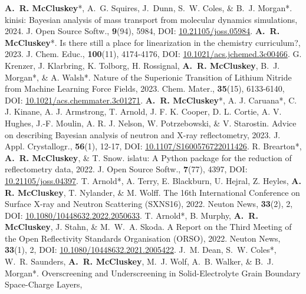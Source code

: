 \begin{benumerate}{25}
  \cvpuby
    {\textbf{A.~R. McCluskey}*, A.~G. Squires, J.~Dunn, S.~W. Coles, \& B.~J. Morgan*.}
    {kinisi: Bayesian analysis of mass transport from molecular dynamics simulations,}
    {2024.}
    {J. Open Source Softw.,}
    {\textbf{9}(94), 5984,}
    {DOI: \href{https://doi.org/10.21105/joss.05984}{10.21105/joss.05984}.}
   \cvpuby
    {\textbf{A.~R. McCluskey}*.}
    {Is there still a place for linearization in the chemistry curriculum?,}
    {2023.}
    {J. Chem. Educ.,}
    {\textbf{100}(11), 4174-4176,}
    {DOI: \href{https://doi.org/10.1021/acs.jchemed.3c00466}{10.1021/acs.jchemed.3c00466}.}
  \cvpuby
    {G. Krenzer, J. Klarbring, K. Tolborg, H. Rossignal, \textbf{A.~R. McCluskey}, B.~J. Morgan*, \& A. Walsh*.}
    {Nature of the Superionic Transition of Lithium Nitride from Machine Learning Force Fields,}
    {2023.}
    {Chem. Mater.,}
    {\textbf{35}(15), 6133-6140,}
    {DOI: \href{https://doi.org/10.1021/acs.chemmater.3c01271}{10.1021/acs.chemmater.3c01271}.}
  \cvpuby
    {\textbf{A.~R. McCluskey}*, A. J. Caruana*, C. J. Kinane, A. J. Armstrong, T. Arnold, J. F. K. Cooper, D. L. Cortie, A. V. Hughes, J.-F. Moulin, A. R. J. Nelson, W. Potrzebowski, \& V. Starostin.}
    {Advice on describing Bayesian analysis of neutron and X-ray reflectometry,}
    {2023.}
    {J. Appl. Crystallogr.,}
    {\textbf{56}(1), 12-17,}
    {DOI: \href{https://doi.org/10.1107/S1600576722011426}{10.1107/S1600576722011426}.}
  \cvpuby
    {R. Brearton*, \textbf{A.~R. McCluskey}, \& T. Snow.}
    {islatu: A Python package for the reduction of reflectometry data,}
    {2022.}
    {J. Open Source Softw.,}
    {\textbf{7}(77), 4397,}
    {DOI: \href{https://doi.org/10.21105/joss.04397}{10.21105/joss.04397}.}
  \cvpuby
    {T. Arnold*, A. Terry, E. Blackburn, U. Hejral, Z. Heyles, \textbf{A. R. McCluskey}, T. Nylander, \& M. Wolff.}
    {The 16th International Conference on Surface X-ray and Neutron Scattering (SXNS16),}
    {2022.}
    {Neuton News,}
    {\textbf{33}(2), 2,}
    {DOI: \href{https://doi.org/10.1080/10448632.2022.2050633}{10.1080/10448632.2022.2050633}.}
  \cvpuby
    {T. Arnold*, B. Murphy, \textbf{A.~R. McCluskey}, J. Stahn, \& M.~W.~A. Skoda.}
    {A Report on the Third Meeting of the Open Reflectivity Standards Organisation (ORSO),}
    {2022.}
    {Neuton News,}
    {\textbf{33}(1), 2,}
    {DOI: \href{https://doi.org/10.1080/10448632.2021.2005422}{10.1080/10448632.2021.2005422}.}
  \cvpuby
    {J.~M. Dean, S.~W. Coles*, W.~R. Saunders, \textbf{A.~R. McCluskey}, M.~J. Wolf, A.~B. Walker, \& B.~J. Morgan*.}
    {Overscreening and Underscreening in Solid-Electrolyte Grain Boundary Space-Charge Layers,}

\end{benumerate}
